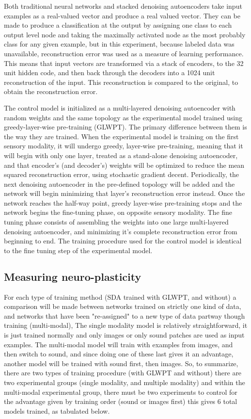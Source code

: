 \documentclass[12pt]{article}
\begin{document}
\begin{doublespacing}
	Both traditional neural networks and stacked denoising autoencoders take input examples as a real-valued vector and produce a real valued vector. They can be made to produce a classification at the output by assigning one class to each output level node and taking the maximally activated node as the most probably class for any given example, but in this experiment, because labeled data was unavailable, reconstruction error was used as a measure of learning performance. This means that input vectors are transformed via a stack of encoders, to the 32 unit hidden code, and then back through the decoders into a 1024 unit reconstruction of the input. This reconstruction is compared to the original, to obtain the reconstruction error.
	
	The control model is initialized as a multi-layered denoising autoencoder with random weights and the same topology as the experimental model trained using greedy-layer-wise pre-training (GLWPT). The primary difference between them is the way they are trained. When the experimental model is training on the first sensory modality, it will undergo greedy, layer-wise pre-training, meaning that it will begin with only one layer, treated as a stand-alone denoising autoencoder, and that encoder's (and decoder's) weights will be optimized to reduce the mean squared reconstruction error, using stochastic gradient decent. Periodically, the next denoising autoencoder in the pre-defined topology will be added and the network will begin minimizing that layer's reconstruction error instead. Once the network reaches the half-way point, greedy layer-wise pre-training stops and the network begins the fine-tuning phase, on opposite sensory modality. The fine tuning phase consists of assembling the weights into one large multi-layered denoising autoencoder, and minimizing it's complete reconstruction error from beginning to end. The training procedure used for the control model is identical to the fine tuning step of the experimental model.
	
	\subsection{Measuring neuro-plasticity}
	For each type of training method (SDA trained with GLWPT, and without)  a comparison will be made between networks trained on strictly one kind of data, and networks that have been "re-assigned" to a new type of data partway though training (multi-modal), The single modality model is relatively  straightforward, it is just trained normally and only images or only sound patches are used as input examples. The multi-modal model will train with examples from images, and then switch to sound, and since doing one of these last gives it an advantage, another model will be trained with sound first, then images.
	So, to summarize, there are two types of training procedure (with GLWPT and without) there are two experimental groups (single modality, and multiple modality) and within the multi-modal experimental group, there must be two experiments to control for the advantage given by training order (sound or images first) this gives 6 total models trained, as tabulated below.
	

\end{doublespacing}
\end{document}
